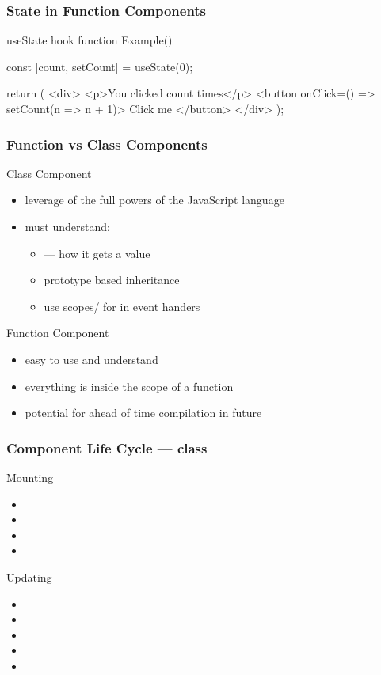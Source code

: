 \begin{frame}[fragile] \frametitle{State in Function Components}
\begin{CodeBox}{useState hook}
function Example() {
  const [count, setCount] = useState(0);

  return (
    <div>
      <p>You clicked {count} times</p>
      <button onClick={() => setCount(n => n + 1)}>
        Click me
      </button>
    </div>
  );
}\end{CodeBox}
\end{frame}

\begin{frame}[fragile] \frametitle{Function vs Class Components}
Class Component
\begin{itemize}
  \item leverage of the full powers of the JavaScript language
  \item must understand:
  \begin{itemize}
    \item {} --- how it gets a value
    \item prototype based inheritance
    \item use scopes/ for  in event handers
  \end{itemize}
\end{itemize}

Function Component
\begin{itemize}
  \item easy to use and understand
  \item everything is inside the scope of a function
  \item potential for ahead of time compilation in future
\end{itemize}

\end{frame}

\begin{frame}[fragile] \frametitle{Component Life Cycle --- class}
Mounting
\begin{itemize}
  \item {}
  \item {}
  \item {}
  \item {}
\end{itemize}
Updating
\begin{itemize}
  \item {}
  \item {}
  \item {}
  \item {}
  \item {}
\end{itemize}
\end{frame}

